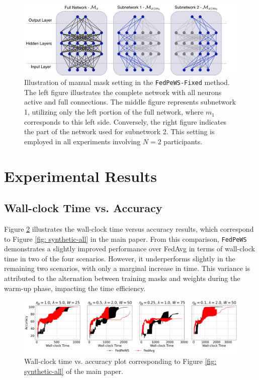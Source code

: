 \documentclass{article}
\begin{document}
\begin{figure}[t]
    \centering
    \includegraphics[width=\linewidth]{images/fixedmask_V1-1500.pdf}
    \caption{Illustration of manual mask setting in the \texttt{FedPeWS-Fixed} method. The left figure illustrates the complete network with all neurons active and full connections. The middle figure represents subnetwork 1, utilizing only the left portion of the full network, where $m_1$ corresponds to this left side. Conversely, the right figure indicates the part of the network used for subnetwork 2. This setting is employed in all experiments involving $N=2$ participants.} 
    \label{fig: fixed-mask-split}
\end{figure}


\section{Experimental Results}

\subsection{Wall-clock Time vs. Accuracy} 
Figure \ref{fig: wall-clock} illustrates the wall-clock time versus accuracy results, which correspond to Figure \ref{fig: synthetic-all} in the main paper. From this comparison, \texttt{FedPeWS} demonstrates a slightly improved performance over FedAvg in terms of wall-clock time in two of the four scenarios. However, it underperforms slightly in the remaining two scenarios, with only a marginal increase in time. This variance is attributed to the alternation between training masks and weights during the warm-up phase, impacting the time efficiency. 

\begin{figure}[t]
    \centering
    \includegraphics[width=\linewidth]{images/wall-clock.pdf}
    \caption{Wall-clock time vs. accuracy plot corresponding to Figure \ref{fig: synthetic-all} of the main paper.}
    \label{fig: wall-clock}
\end{figure}
\end{document}
